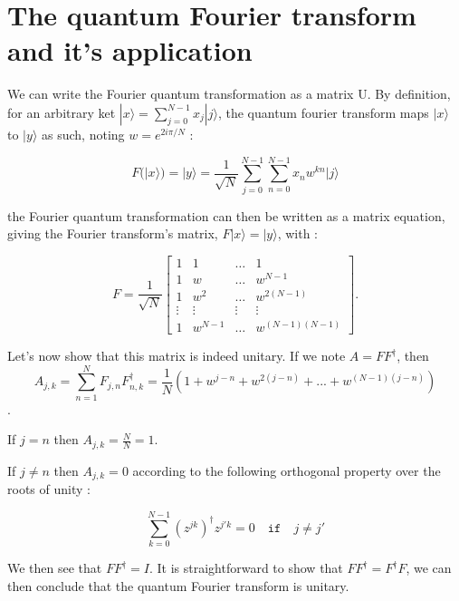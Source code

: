 \chapter{The quantum Fourier transform and it's application}




We can write the Fourier quantum transformation as a matrix U.
By definition, for an arbitrary ket $|x\rangle = \sum_{j=0}^{N-1} x_j | j \rangle$, the 
quantum fourier transform maps $|x\rangle$ to $|y\rangle$ as such, noting $w = e^{2 i \pi /N}$ :

$$F(|x\rangle) = |y\rangle = \frac{1}{\sqrt{N}}  \sum_{j=0}^{N-1}  \sum_{n=0}^{N-1} x_n w^{k n} | j \rangle$$

the Fourier quantum transformation can then be written as a matrix equation, giving the Fourier transform's
matrix, $F |x\rangle = |y\rangle$, with :

$$ F =  \frac{1}{\sqrt{N}} \begin{bmatrix}
	1      & 1       & \hdots & 1         \\
	1      & w       & \hdots & w^{N-1}   \\ 
	1      & w^2     & \hdots & w^{2(N-1)} \\
	\vdots & \vdots  & \vdots & \vdots     \\
	1      & w^{N-1} & \hdots & w^{(N-1)(N-1)}
\end{bmatrix}.$$

Let's now show that this matrix is indeed unitary.
If we note $A = F F^{\dagger}$, then 
$$A_{j,k} = \sum_{n=1}^N F_{j,n} F^{\dagger}_{n,k} = \frac{1}{N} (1 + w^{j-n}+w^{2(j-n)}+...+w^{(N-1)(j-n)})$$.

If $j=n$ then $A_{j,k} = \frac{N}{N} = 1$.

If $j \neq n$ then $A_{j,k} = 0$ according to the following orthogonal property over the roots of unity : 

$$ \sum_{k=0}^{N-1} (z^{jk})^\dagger z^{j' k} = 0 \quad \mathtt{if } \quad j \neq j'$$

We then see that $F F^{\dagger} = I$.
It is straightforward to show that $F F^{\dagger} =F^{\dagger} F$, we can then conclude that
the quantum Fourier transform is unitary.


